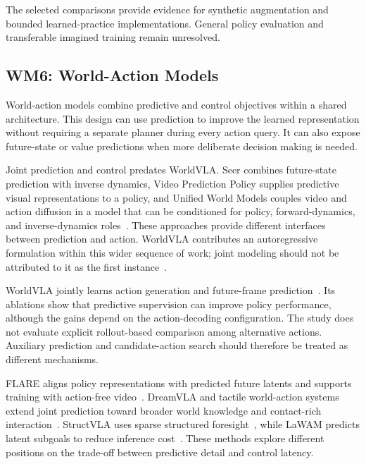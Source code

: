 \documentclass{ieeeaccess}
\begin{document}
\textcolor[RGB]{104,48,148}{The selected comparisons provide evidence for synthetic augmentation and bounded learned-practice implementations.} General policy evaluation and transferable imagined training remain unresolved.

\subsection{WM6: World-Action Models}
\label{sec:wm6}

World-action models combine predictive and control objectives within a shared architecture. This design can use prediction to improve the learned representation without requiring a separate planner during every action query. It can also expose future-state or value predictions when more deliberate decision making is needed.

\textcolor[RGB]{104,48,148}{Joint prediction and control predates WorldVLA. Seer combines future-state prediction with inverse dynamics, Video Prediction Policy supplies predictive visual representations to a policy, and Unified World Models couples video and action diffusion in a model that can be conditioned for policy, forward-dynamics, and inverse-dynamics roles~\cite{seer,vpp,uwm}. These approaches provide different interfaces between prediction and action. WorldVLA contributes an autoregressive formulation within this wider sequence of work; joint modeling should not be attributed to it as the first instance~\cite{worldvla}.}

WorldVLA jointly learns action generation and future-frame prediction~\cite{worldvla}. Its ablations show that predictive supervision can improve policy performance, although the gains depend on the action-decoding configuration. The study does not evaluate explicit rollout-based comparison among alternative actions. Auxiliary prediction and candidate-action search should therefore be treated as different mechanisms.

FLARE aligns policy representations with predicted future latents and supports training with action-free video~\cite{flarewm}. DreamVLA and tactile world-action systems extend joint prediction toward broader world knowledge and contact-rich interaction~\cite{dreamvla,dreamtac,touchworld}. StructVLA uses sparse structured foresight~\cite{structvla}, while LaWAM predicts latent subgoals to reduce inference cost~\cite{lawam}. These methods explore different positions on the trade-off between predictive detail and control latency.
\end{document}
